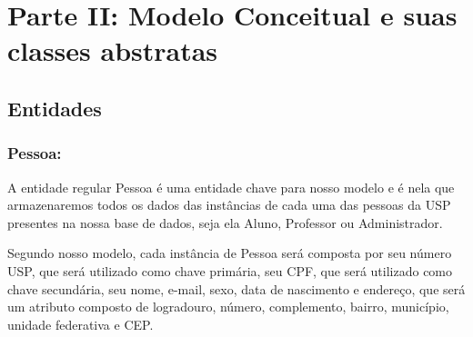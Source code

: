 \documentclass{report}
\begin{document}
\chapter{Parte II: Modelo Conceitual e suas classes abstratas}

\section{Entidades}
\subsection{Pessoa:}
 	A entidade regular Pessoa é uma entidade chave para nosso modelo e é nela que armazenaremos todos os dados das instâncias de cada uma das pessoas da USP presentes na nossa base de dados, seja ela Aluno, Professor ou Administrador.
	
	Segundo nosso modelo, cada instância de Pessoa será composta por seu número USP, que será utilizado como chave primária, seu CPF, que será utilizado como chave secundária, seu nome, e-mail, sexo, data de nascimento e endereço, que será um atributo composto de logradouro, número, complemento, bairro, município, unidade federativa e CEP.
	
\end{document}
